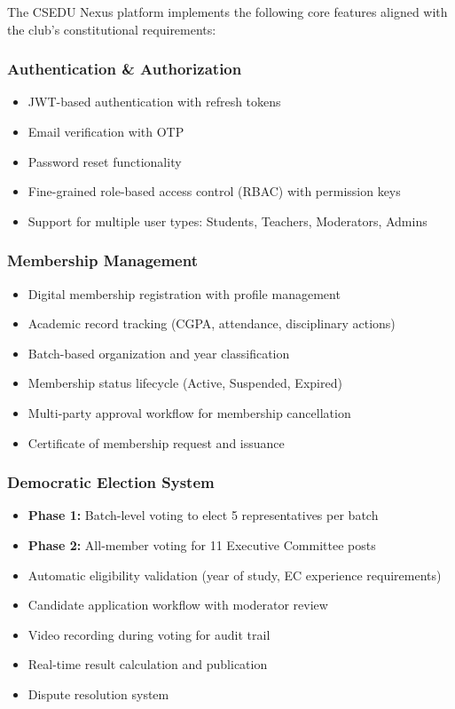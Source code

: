 \documentclass[12pt,a4paper]{article}
\begin{document}
The CSEDU Nexus platform implements the following core features aligned with the club's constitutional requirements:

\subsubsection{Authentication \& Authorization}
\begin{itemize}[noitemsep]
  \item JWT-based authentication with refresh tokens
  \item Email verification with OTP
  \item Password reset functionality
  \item Fine-grained role-based access control (RBAC) with permission keys
  \item Support for multiple user types: Students, Teachers, Moderators, Admins
\end{itemize}

\subsubsection{Membership Management}
\begin{itemize}[noitemsep]
  \item Digital membership registration with profile management
  \item Academic record tracking (CGPA, attendance, disciplinary actions)
  \item Batch-based organization and year classification
  \item Membership status lifecycle (Active, Suspended, Expired)
  \item Multi-party approval workflow for membership cancellation
  \item Certificate of membership request and issuance
\end{itemize}

\subsubsection{Democratic Election System}
\begin{itemize}[noitemsep]
  \item \textbf{Phase 1:} Batch-level voting to elect 5 representatives per batch
  \item \textbf{Phase 2:} All-member voting for 11 Executive Committee posts
  \item Automatic eligibility validation (year of study, EC experience requirements)
  \item Candidate application workflow with moderator review
  \item Video recording during voting for audit trail
  \item Real-time result calculation and publication
  \item Dispute resolution system
\end{itemize}
\end{document}
